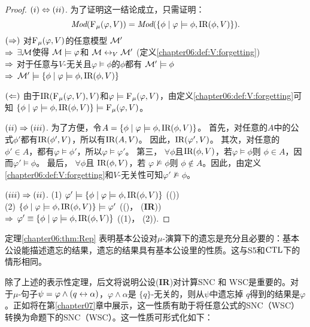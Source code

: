 \begin{proof}
	$(i) \Leftrightarrow (ii)$. 为了证明这一结论成立，只需证明：
	\[
	\textit{Mod}({\textsc{F}_{\textsc{$\mu$}}}(\varphi, V)) = \textit{Mod}(\{\phi \mid \varphi \models \phi, \textrm{IR}(\phi, V)\}).\]
	$(\Rightarrow)$ 对${\textsc{F}_{\textsc{$\mu$}}}(\varphi, V)$的任意模型 ${\cal M}'$ \\
	$\Rightarrow$  $\exists{\cal M}$使得 ${\cal M} \models \varphi$和 ${\cal M} \leftrightarrow_V {\cal M}'$ \hfill (定义\ref{chapter06:def:V:forgetting}) \\
	$\Rightarrow$ 对于任意与$V$-无关且$\varphi \models \phi$的$\phi$都有 ${\cal M}' \models \phi$ \\
	$\Rightarrow$ ${\cal M}' \models \{\phi \mid \varphi \models \phi, \textrm{IR}(\phi, V)\}$
	
	$(\Leftarrow)$ 由于$\textrm{IR}({\textsc{F}_{\textsc{$\mu$}}}(\varphi, V),V)$和$\varphi \models {\textsc{F}_{\textsc{$\mu$}}}(\varphi, V)$，由定义\ref{chapter06:def:V:forgetting}可知 $\{\phi \mid \varphi \models \phi, \textrm{IR}(\phi, V)\} \models {\textsc{F}_{\textsc{$\mu$}}}(\varphi, V)$。
	
	$(ii) \Rightarrow (iii)$. 为了方便，令$A = \{\phi \mid \varphi \models \phi, \textrm{IR}(\phi, V)\}$。
	首先，对任意的$A$中的公式$\phi'$都有$\textrm{IR}(\phi',V)$，所以有$\textrm{IR}(A,V)$。
	因此，$\textrm{IR}(\varphi', V)$。 其次，对任意的 $\phi'\in A$，都有$\varphi \models \phi'$，所以$\varphi \models \varphi'$。
	第三， $\forall \phi$且$\textrm{IR}(\phi, V)$，若$\varphi \models \phi$则 $\phi \in A$，因而$\varphi' \models \phi$。
最后， $\forall \phi$且 $\textrm{IR}(\phi, V)$，若 $\varphi \not \models \phi$则 $\phi \not \in A$。因此，由定义\ref{chapter06:def:V:forgetting}和$V$-无关性可知$\varphi' \not \models \phi$。
	
	$(iii) \Rightarrow (ii)$. (1) $\varphi' \models \{\phi \mid \varphi \models \phi, \textrm{IR}(\phi, V)\}$  \hfill ((\PP))\\
	(2) $\{\phi \mid \varphi \models \phi, \textrm{IR}(\phi, V)\} \models \varphi'$ \hfill ((\W)， (\textbf{IR}))\\
	$\Rightarrow$ $\varphi'\equiv \{\phi \mid\varphi \models \phi, \textrm{IR}(\phi, V)\}$ \hfill ((1)， (2)).
\end{proof}


定理\ref{chapter06:thm:Rep} 表明基本公设对$\mu$-演算下的遗忘是充分且必要的：基本公设能描述遗忘的结果，遗忘的结果具有基本公设里的性质。这与S5和$\textrm{CTL}$下的情形相同。

除了上述的表示性定理，后文将说明公设(\textbf{IR})对计算SNC 和 WSC是重要的。对于$\mu$-句子$\psi = \varphi \wedge (q \leftrightarrow \alpha)$，$\varphi \wedge \alpha$是 $\{q\}$-无关的，则从$\psi$中遗忘掉 $q$得到的结果是$\varphi$。正如将在第\ref{chapter07}章中展示，这一性质有助于将任意公式的SNC（WSC）转换为命题下的SNC（WSC）。这一性质可形式化如下：

